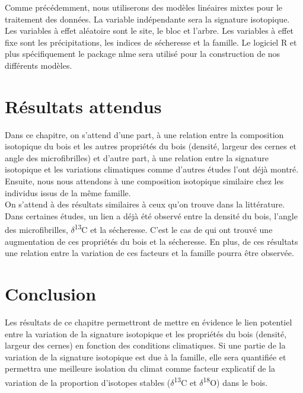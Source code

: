 \documentclass{report}
\newcommand{\Ctreize}{$\delta$\textsuperscript{13}C\xspace}
\newcommand{\Odixhuit}{$\delta$\textsuperscript{18}O\xspace}
\begin{document}
Comme précédemment, nous utiliserons des modèles linéaires mixtes pour le traitement des données. La variable indépendante sera la signature isotopique. Les variables à effet aléatoire sont le site, le bloc et l'arbre. Les variables à effet fixe sont les précipitations, les indices de sécheresse et la famille. Le logiciel R et plus spécifiquement le package nlme sera utilisé pour la construction de nos différents modèles. 

\section{Résultats attendus}

Dans ce chapitre, on s'attend d'une part, à une relation entre la composition isotopique du bois et les autres propriétés du bois (densité, largeur des cernes et angle des microfibrilles) et d'autre part, à une relation entre la signature isotopique et les variations climatiques comme d'autres études l'ont déjà montré. Ensuite, nous nous attendons à une composition isotopique similaire chez les individus issus de la même famille.\\

On s'attend à des résultats similaires à ceux qu'on trouve dans la littérature. Dans certaines études, un lien a déjà été observé entre la densité du bois, l'angle des microfibrilles, \Ctreize et la sécheresse. C'est le cas de \cite{Drew2009} qui ont trouvé une augmentation de ces propriétés du bois et la sécheresse. En plus, de ces résultats une relation entre la variation de ces facteurs et la famille pourra être observée.  

\section{Conclusion}

Les résultats de ce chapitre permettront de mettre en évidence le lien potentiel entre la variation de la signature isotopique et les propriétés du bois (densité, largeur des cernes) en fonction des conditions climatiques. Si une partie de la variation de la signature isotopique est due à la famille, elle sera quantifiée et permettra une meilleure isolation du climat comme facteur explicatif de la variation de la proportion d'isotopes stables (\Ctreize et \Odixhuit) dans le bois.\\
\end{document}

